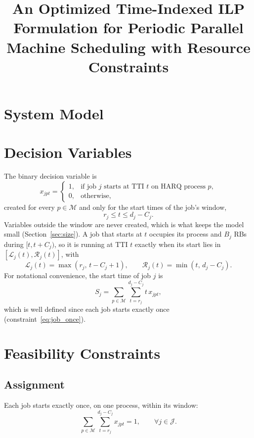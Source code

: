 \documentclass[11pt]{article}
\title{An Optimized Time-Indexed ILP Formulation for Periodic Parallel Machine Scheduling with Resource Constraints}
\author{}
\date{}
\begin{document}
\maketitle

\section{System Model}\label{sec:model}




\section{Decision Variables}\label{sec:vars}

The binary decision variable is
\[
x_{jpt}=
\begin{cases}
1, & \text{if job }j\text{ starts at TTI }t\text{ on HARQ process }p,\\
0, & \text{otherwise},
\end{cases}
\]
created for every $p \in \mathcal{M}$ and only for the start times of the
job's window,
\[
r_j \le t \le d_j - C_j .
\]
Variables outside the window are never created, which is what keeps the model
small (Section~\ref{sec:size}). A job that starts at $t$ occupies its process
and $B_j$ RBs during $[t, t + C_j)$, so it is running at TTI $t$ exactly when
its start lies in $[\mathcal{L}_j(t), \mathcal{R}_j(t)]$, with
\[
\mathcal{L}_j(t) = \max(r_j,\, t - C_j + 1), \qquad
\mathcal{R}_j(t) = \min(t,\, d_j - C_j).
\]
For notational convenience, the start time of job $j$ is
\[
S_j = \sum_{p\in\mathcal M} \sum_{t=r_j}^{d_j-C_j} t \, x_{jpt},
\]
which is well defined since each job starts exactly once
(constraint~\eqref{eq:job_once}).


\section{Feasibility Constraints}\label{sec:feas}

\subsection*{Assignment}

Each job starts exactly once, on one process, within its window:
\begin{equation}
\sum_{p\in\mathcal M} \sum_{t=r_j}^{d_j-C_j} x_{jpt} = 1,
\qquad \forall j\in\mathcal J.
\label{eq:job_once}
\end{equation}
\end{document}
